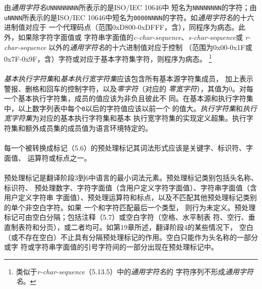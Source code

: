 由\textit{通用字符名}\texttt{\bslh UNNNNNNNN}所表示的是ISO/IEC 10646中
短名为\texttt{NNNNNNNN}的字符；由\texttt{\bslh uNNNN}所表示的是ISO/IEC
10646中短名为\texttt{0000NNNN}的字符。如\textit{通用字符名}的十六进制值对应于
一个代理码点（范围0xD800-0xDFFF，含），同程序为病态。此外，如果除字符字面值或
字符串字面值的\textit{c-char-sequence}、\textit{s-char-sequence}或
\textit{r-char-sequence} 以外的\textit{通用字符名}的十六进制值对应于控制
（范围为0x00-0x1F或0x7F-0x9F，含）字符或对应于基本字符集字符，则程序为病态。
\footnote{类似于\textit{r-char-sequence}（5.13.5）中的\textit{通用字符名}的
字符序列不形成\textit{通用字符名}。}

\paragraph{}
\textit{基本执行字符集}和\textit{基本执行宽字符集}应该包含所有基本源字符集成员，
加上表示警报、删格和回车的控制字符，以及\textit{零字符}（对应的
\textit{零宽字符}），其值为0。对每一个基本执行字符集，成员的值应该为非负且彼此不
同。在基本源和执行字符集中，以上数字列表中每个\texttt{0}以后的字符值应该以前一个
的值大。\textit{执行字符集}和\textit{执行宽字符集}为对应的基本执行字符集和基本
执行宽字符集的实现定义超集。执行字符集和额外成员集的成员值为语言环境特定的。


\paragraph{}
每一个被转换成标记（5.6）的预处理标记其词法形式应该是关键字、标识符、字面值、
运算符或标点之一。

\paragraph{}
预处理标记是翻译阶段3到6中语言的最小词法元素。预处理标记类别包括头名称、标识符、
预处理数字、字符字面值（含用户定义字符字面值）、字符串字面值（含用户定义字符串
字面值）、预处理运算符和标点，以及不匹配其他预处理标记类别的单个非空白字符。如果
一个\texttt{\qsgl{}}和\texttt{\qdbl{}}字符匹配最后一个类型，
则行为未定义。预处理标记可由空白分隔；包括注释（5.7）或空白字符（空格、水平制表
符、空行、垂直制表符和分页），或二者均可。如第19章所述，翻译阶段4的某些情况下，
空白（或不存在空白）不止具有分隔预处理标记的作用。空白只能作为头名称的一部分或字
符或字符串字面值的引号字符间的一部分出现在预处理标记中。

